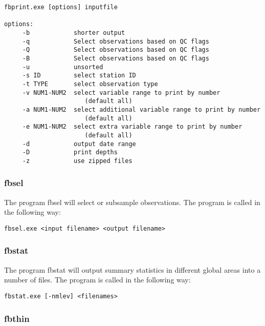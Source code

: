 \documentclass[NEMO_book]{subfiles}
\begin{document}
\begin{alltt}
\footnotesize
\begin{verbatim}
fbprint.exe [options] inputfile

options:
     -b            shorter output
     -q            Select observations based on QC flags
     -Q            Select observations based on QC flags
     -B            Select observations based on QC flags
     -u            unsorted
     -s ID         select station ID  
     -t TYPE       select observation type
     -v NUM1-NUM2  select variable range to print by number 
                      (default all)
     -a NUM1-NUM2  select additional variable range to print by number 
                      (default all)
     -e NUM1-NUM2  select extra variable range to print by number 
                      (default all)
     -d            output date range
     -D            print depths
     -z            use zipped files
\end{verbatim}
\end{alltt}

\subsubsection{fbsel}

The program fbsel will select or subsample observations. The program is called in the
following way:

\begin{alltt}
\footnotesize
\begin{verbatim}
fbsel.exe <input filename> <output filename>
\end{verbatim}
\end{alltt}

\subsubsection{fbstat}

The program fbstat will output summary statistics in different global areas into a number of
files. The program is called in the following way:

\begin{alltt}
\footnotesize
\begin{verbatim}
fbstat.exe [-nmlev] <filenames>
\end{verbatim}
\end{alltt}

\subsubsection{fbthin}
\end{document}
